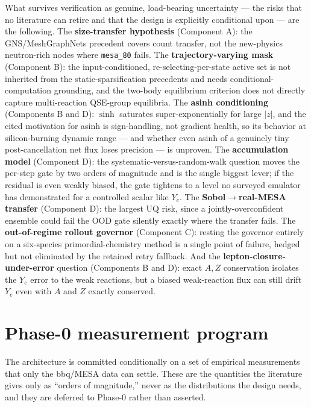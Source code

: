 \documentclass[11pt]{article}
\newcommand{\msn}[1]{\texttt{mesa\_#1}}
\newcommand{\Ye}{Y_{e}}
\begin{document}
What survives verification as genuine, load-bearing uncertainty --- the risks that no literature can retire and that the design is explicitly conditional upon --- are the following. The \textbf{size-transfer hypothesis} (Component A): the GNS/MeshGraphNets precedent covers count transfer, not the new-physics neutron-rich nodes where \msn{80} fails. The \textbf{trajectory-varying mask} (Component B): the input-conditioned, re-selecting-per-state active set is not inherited from the static-sparsification precedents and needs conditional-computation grounding, and the two-body equilibrium criterion does not directly capture multi-reaction QSE-group equilibria. The \textbf{asinh conditioning} (Components B and D): $\sinh$ saturates super-exponentially for large $|z|$, and the cited motivation for asinh is sign-handling, not gradient health, so its behavior at silicon-burning dynamic range --- and whether even asinh of a genuinely tiny post-cancellation net flux loses precision --- is unproven. The \textbf{accumulation model} (Component D): the systematic-versus-random-walk question moves the per-step gate by two orders of magnitude and is the single biggest lever; if the residual is even weakly biased, the gate tightens to a level no surveyed emulator has demonstrated for a controlled scalar like $\Ye$. The \textbf{Sobol$\to$real-MESA transfer} (Component D): the largest UQ risk, since a jointly-overconfident ensemble could fail the OOD gate silently exactly where the transfer fails. The \textbf{out-of-regime rollout governor} (Component C): resting the governor entirely on a six-species primordial-chemistry method is a single point of failure, hedged but not eliminated by the retained retry fallback. And the \textbf{lepton-closure-under-error} question (Components B and D): exact $A,Z$ conservation isolates the $\Ye$ error to the weak reactions, but a biased weak-reaction flux can still drift $\Ye$ even with $A$ and $Z$ exactly conserved.

\section{Phase-0 measurement program}

The architecture is committed conditionally on a set of empirical measurements that only the bbq/MESA data can settle. These are the quantities the literature gives only as ``orders of magnitude,'' never as the distributions the design needs, and they are deferred to Phase-0 rather than asserted.
\end{document}
